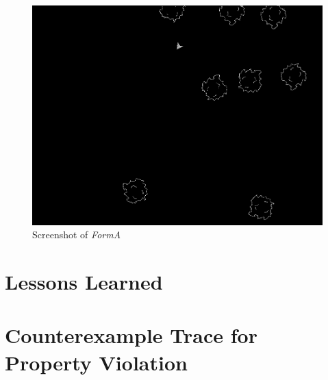 \documentclass{article}
\newcommand{\Name}{\textit{FormA}\xspace}
\begin{document}
\begin{figure}[!h]
    \includegraphics[width=\linewidth]{gameplay.png}
    \caption{Screenshot of \Name}
    \label{fig:gameplay}
\end{figure}

\section{Lessons Learned}




\appendix
\section{Counterexample Trace for Property Violation}
\label{appendix:trace}

\end{document}
